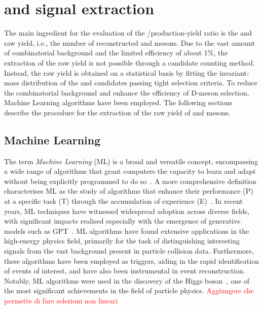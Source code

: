 \chapter{\texorpdfstring{\ds and \dpl signal extraction}{Ds+ and D+ signal extraction}}

The main ingredient for the evaluation of the \ds/\dpl production-yield ratio is the \ds and \dpl raw yield, i.e., the number of reconstructed \ds and \dpl mesons. Due to the vast amount of combinatorial background and the limited efficiency of about 1\%, the extraction of the raw yield is not possible through a candidate counting method. Instead, the raw yield is obtained on a statistical basis by fitting the invariant-mass distribution of the \ds and \dpl candidates passing tight selection criteria. To reduce the combinatorial background and enhance the efficiency of D-meson selection, Machine Learning algorithms have been employed. The following sections describe the procedure for the extraction of the raw yield of \ds and \dpl mesons. 

\section{Machine Learning}
The term \emph{Machine Learning} (ML) is a broad and versatile concept, encompassing a wide range of algorithms that grant computers the capacity to learn and adapt without being explicitly programmed to do so~\cite{5392560}. A more comprehensive definition characterises ML as the study of algorithms that enhance their performance (P) at a specific task (T) through the accumulation of experience (E)~\cite{mitchell1997machine}. In recent years, ML techniques have witnessed widespread adoption across diverse fields, with significant impacts realised especially with the emergence of generative models such as GPT~\cite{openai2023gpt4}.
ML algorithms have found extensive applications in the high-energy physics field, primarily for the task of distinguishing interesting signals from the vast background present in particle collision data. Furthermore, these algorithms have been employed as triggers, aiding in the rapid identification of events of interest, and have also been instrumental in event reconstruction. Notably, ML algorithms were used in the discovery of the Higgs boson~\cite{CMS:2012qbp}, one of the most significant achievements in the field of particle physics. \textcolor{red}{Aggiungere che permette di fare selezioni non lineari}


